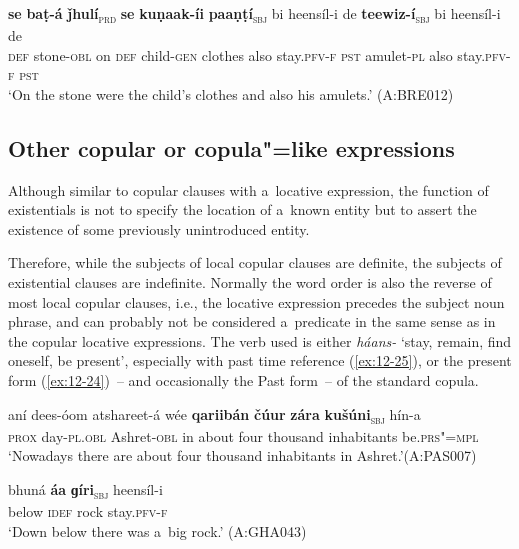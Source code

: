 \begin{exe}
\ex
\label{ex:12-23}
\gll {\ob}\textbf{se} \textbf{baṭ-á} \textbf{ǰhulí}{\cb}\textsubscript{\textsc{\upshape prd}} {\ob}\textbf{se} \textbf{kuṇaak-íi} \textbf{paaṇṭí}{\cb}\textsubscript{\textsc{\upshape sbj}} bi heensíl-i de {\ob}\textbf{teewiz-í}{\cb}\textsubscript{\textsc{\upshape sbj}} bi heensíl-i de\\
\textsc{def} stone-\textsc{obl} on \textsc{def} child-\textsc{gen} clothes  also stay.\textsc{pfv-f}
\textsc{pst} amulet-\textsc{pl} also stay.\textsc{pfv-f} \textsc{pst}\\
\glt `On the stone were the child's clothes and also his amulets.' (A:BRE012)
\end{exe}

\subsection{Other copular or copula"=like expressions}
\label{subsec:12-1-4}

 Although similar to copular clauses with a~locative expression, the function of existentials is not to specify the location of a~known entity but to assert the existence of some previously unintroduced entity. 


Therefore, while the subjects of local copular clauses are definite, the subjects of existential clauses are indefinite. Normally the word order is also the reverse of most local copular clauses, i.e., the locative expression precedes the subject noun phrase, and can probably not be considered a~predicate in the same sense as in the copular locative expressions. The verb used is either \textit{háans-} `stay, remain, find oneself, be present', especially with past time reference (\ref{ex:12-25}), or the present form (\ref{ex:12-24})~-- and occasionally the Past form~-- of the standard copula.

\begin{exe}
\ex
\label{ex:12-24}
\gll aní dees-óom atshareet-á wée {\ob}\textbf{qariibán} \textbf{čúur} \textbf{zára} \textbf{kušúni}{\cb}\textsubscript{\textsc{\upshape sbj}} hín-a \\
\textsc{prox} day-\textsc{pl.obl} Ashret-\textsc{obl} in about  four thousand inhabitants be.\textsc{prs"=mpl}\\
\glt `Nowadays there are about four thousand inhabitants in Ashret.'\newline (A:PAS007)

\ex
\label{ex:12-25}
\gll bhuná {\ob}\textbf{áa} \textbf{ɡíri}{\cb}\textsubscript{\textsc{\upshape sbj}} heensíl-i\\
below \textsc{idef} rock stay.\textsc{pfv-f} \\
\glt `Down below there was a~big rock.' (A:GHA043)
\end{exe}

